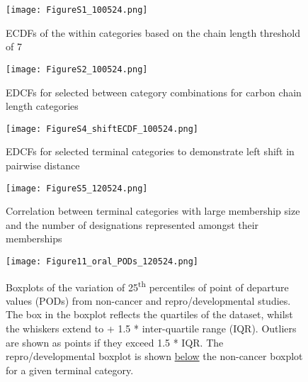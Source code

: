 \documentclass[
  super,
  preprint,
  3p]{elsarticle}
\begin{document}
\begin{figure}

{\centering \texttt{[image: FigureS1\_100524.png]}

}

\caption{\label{fig-ecdfs-within}ECDFs of the within categories based on
the chain length threshold of 7}

\end{figure}

\newpage{}

\begin{figure}

{\centering \texttt{[image: FigureS2\_100524.png]}

}

\caption{\label{fig-ecdfs-bet}EDCFs for selected between category
combinations for carbon chain length categories}

\end{figure}

\begin{figure}

{\centering \texttt{[image: FigureS4\_shiftECDF\_100524.png]}

}

\caption{\label{fig-ecdfs-left}EDCFs for selected terminal categories to
demonstrate left shift in pairwise distance}

\end{figure}

\begin{figure}

{\centering \texttt{[image: FigureS5\_120524.png]}

}

\caption{\label{fig-cat-mem}Correlation between terminal categories with
large membership size and the number of designations represented amongst
their memberships}

\end{figure}

\begin{figure}

{\centering \texttt{[image: Figure11\_oral\_PODs\_120524.png]}

}

\caption{\label{fig-pods-all}Boxplots of the variation of
25\textsuperscript{th} percentiles of point of departure values (PODs)
from non-cancer and repro/developmental studies. The box in the boxplot
reflects the quartiles of the dataset, whilst the whiskers extend to +
1.5 * inter-quartile range (IQR). Outliers are shown as points if they
exceed 1.5 * IQR. The repro/developmental boxplot is shown \ul{below}
the non-cancer boxplot for a given terminal category.}

\end{figure}
\end{document}
